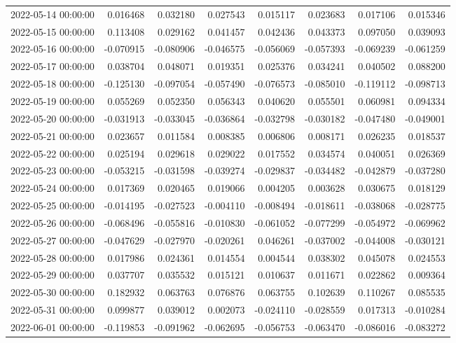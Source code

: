\begin{tabular}{lrrrrrrr}
2022-05-14 00:00:00 & 0.016468 & 0.032180 & 0.027543 & 0.015117 & 0.023683 & 0.017106 & 0.015346 \\
2022-05-15 00:00:00 & 0.113408 & 0.029162 & 0.041457 & 0.042436 & 0.043373 & 0.097050 & 0.039093 \\
2022-05-16 00:00:00 & -0.070915 & -0.080906 & -0.046575 & -0.056069 & -0.057393 & -0.069239 & -0.061259 \\
2022-05-17 00:00:00 & 0.038704 & 0.048071 & 0.019351 & 0.025376 & 0.034241 & 0.040502 & 0.088200 \\
2022-05-18 00:00:00 & -0.125130 & -0.097054 & -0.057490 & -0.076573 & -0.085010 & -0.119112 & -0.098713 \\
2022-05-19 00:00:00 & 0.055269 & 0.052350 & 0.056343 & 0.040620 & 0.055501 & 0.060981 & 0.094334 \\
2022-05-20 00:00:00 & -0.031913 & -0.033045 & -0.036864 & -0.032798 & -0.030182 & -0.047480 & -0.049001 \\
2022-05-21 00:00:00 & 0.023657 & 0.011584 & 0.008385 & 0.006806 & 0.008171 & 0.026235 & 0.018537 \\
2022-05-22 00:00:00 & 0.025194 & 0.029618 & 0.029022 & 0.017552 & 0.034574 & 0.040051 & 0.026369 \\
2022-05-23 00:00:00 & -0.053215 & -0.031598 & -0.039274 & -0.029837 & -0.034482 & -0.042879 & -0.037280 \\
2022-05-24 00:00:00 & 0.017369 & 0.020465 & 0.019066 & 0.004205 & 0.003628 & 0.030675 & 0.018129 \\
2022-05-25 00:00:00 & -0.014195 & -0.027523 & -0.004110 & -0.008494 & -0.018611 & -0.038068 & -0.028775 \\
2022-05-26 00:00:00 & -0.068496 & -0.055816 & -0.010830 & -0.061052 & -0.077299 & -0.054972 & -0.069962 \\
2022-05-27 00:00:00 & -0.047629 & -0.027970 & -0.020261 & 0.046261 & -0.037002 & -0.044008 & -0.030121 \\
2022-05-28 00:00:00 & 0.017986 & 0.024361 & 0.014554 & 0.004544 & 0.038302 & 0.045078 & 0.024553 \\
2022-05-29 00:00:00 & 0.037707 & 0.035532 & 0.015121 & 0.010637 & 0.011671 & 0.022862 & 0.009364 \\
2022-05-30 00:00:00 & 0.182932 & 0.063763 & 0.076876 & 0.063755 & 0.102639 & 0.110267 & 0.085535 \\
2022-05-31 00:00:00 & 0.099877 & 0.039012 & 0.002073 & -0.024110 & -0.028559 & 0.017313 & -0.010284 \\
2022-06-01 00:00:00 & -0.119853 & -0.091962 & -0.062695 & -0.056753 & -0.063470 & -0.086016 & -0.083272 \\

\end{tabular}
